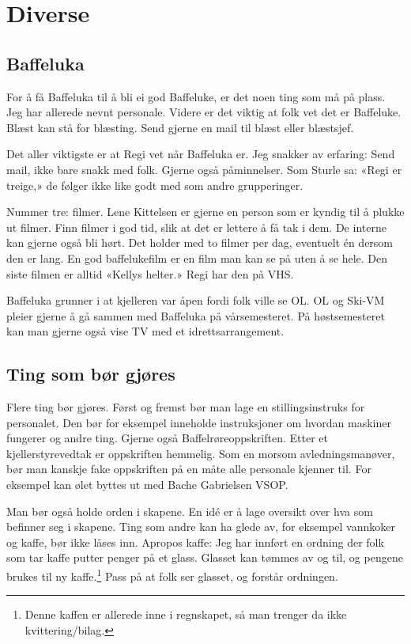 \section{Diverse}
\subsection{Baffeluka}
For å få Baffeluka til å bli ei god Baffeluke, er det noen ting
som må på plass. Jeg har allerede nevnt personale. Videre er det viktig
at folk vet det er Baffeluke. Blæst kan stå for blæsting. Send gjerne en 
mail til blæst eller blæstsjef. 

Det aller viktigste er at Regi vet når
Baffeluka er. Jeg snakker av erfaring: Send mail, ikke bare snakk med folk.
Gjerne også påminnelser. Som Sturle sa: «Regi er treige,» de følger ikke like
godt med som andre grupperinger. 

Nummer tre: filmer. Lene Kittelsen er gjerne en person som er kyndig til å
plukke ut filmer. Finn filmer i god tid, slik at det er lettere å få tak i dem.
De interne kan gjerne også bli hørt. Det holder med to filmer per dag, eventuelt
\'en dersom den er lang. En god baffelukefilm er en film man kan se på uten å se
hele. Den siste filmen er alltid «Kellys helter.» Regi har den på VHS.

Baffeluka grunner i at kjelleren var åpen
fordi folk ville se OL. OL og Ski-VM pleier gjerne å gå sammen
med Baffeluka på vårsemesteret. På høstsemesteret kan man gjerne også vise
TV med et idrettsarrangement.

\subsection{Ting som bør gjøres}
Flere ting bør gjøres. Først og fremst bør man lage en stillingsinstruks for
personalet. Den bør for eksempel inneholde instruksjoner om hvordan maskiner
fungerer og andre ting. Gjerne også Baffelrøreoppskriften. Etter et 
kjellerstyrevedtak er oppskriften hemmelig. Som en morsom avledningsmanøver,
bør man kanskje fake oppskriften på en måte alle personale kjenner til.
For eksempel kan ølet byttes ut med Bache Gabrielsen VSOP.

Man bør også holde orden i skapene. En id\'e er å lage oversikt over hva som 
befinner seg i skapene. Ting som andre kan ha glede av, for eksempel vannkoker
og kaffe, bør ikke låses inn. Apropos kaffe: Jeg har innført en ordning der
folk som tar kaffe putter penger på et glass. Glasset kan tømmes av og til,
og pengene brukes til ny kaffe.\footnote{Denne kaffen er allerede inne i regnskapet,
så man trenger da ikke kvittering/bilag.} Pass på at folk ser glasset, og forstår
ordningen.

